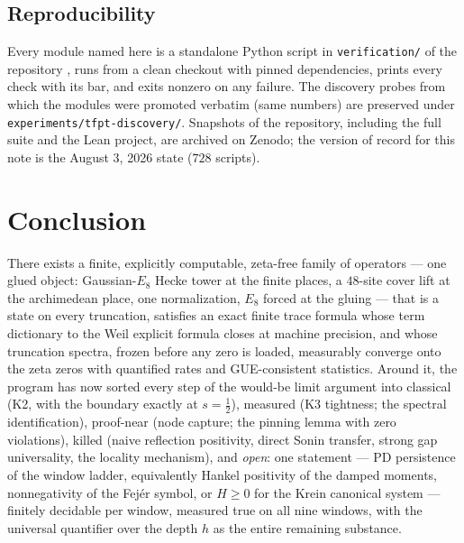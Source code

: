 \documentclass[11pt,a4paper]{article}
\theoremstyle{remark}
\begin{document}
\subsection{Reproducibility}
Every module named here is a standalone Python script in
\texttt{verification/} of the repository \cite{TFPT}, runs from a
clean checkout with pinned dependencies, prints every check with its
bar, and exits nonzero on any failure.  The discovery probes from
which the modules were promoted verbatim (same numbers) are preserved
under \texttt{experiments/tfpt-discovery/}.  Snapshots of the
repository, including the full suite and the Lean project, are
archived on Zenodo; the version of record for this note is the
August 3, 2026 state ($728$ scripts).

\section{Conclusion}\label{sec:conclusion}

There exists a finite, explicitly computable, zeta-free family of
operators --- one glued object: Gaussian-$E_8$ Hecke tower at the
finite places, a $48$-site cover lift at the archimedean place, one
normalization, $E_8$ forced at the gluing --- that is a state on
every truncation, satisfies an exact finite trace formula whose term
dictionary to the Weil explicit formula closes at machine precision,
and whose truncation spectra, frozen before any zero is loaded,
measurably converge onto the zeta zeros with quantified rates and
GUE-consistent statistics.  Around it, the program has now sorted
every step of the would-be limit argument into classical
(K2, with the boundary exactly at $s=\tfrac12$), measured (K3
tightness; the spectral identification), proof-near (node capture;
the pinning lemma with zero violations), killed (naive reflection
positivity, direct Sonin transfer, strong gap universality, the
locality mechanism), and \emph{open}: one statement --- PD
persistence of the window ladder, equivalently Hankel positivity of
the damped moments, nonnegativity of the Fej\'er symbol, or
$H\ge0$ for the Krein canonical system --- finitely decidable per
window, measured true on all nine windows, with the universal
quantifier over the depth $h$ as the entire remaining substance.
\end{document}
